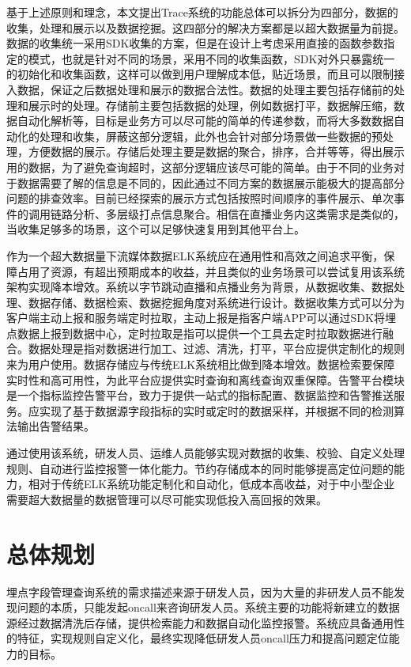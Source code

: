 基于上述原则和理念，本文提出Trace系统的功能总体可以拆分为四部分，数据的收集，处理和展示以及数据挖掘。这四部分的解决方案都是以超大数据量为前提。数据的收集统一采用SDK收集的方案，但是在设计上考虑采用直接的函数参数指定的模式，也就是针对不同的场景，采用不同的收集函数，SDK对外只暴露统一的初始化和收集函数，这样可以做到用户理解成本低，贴近场景，而且可以限制接入数据，保证之后数据处理和展示的数据合法性。数据的处理主要包括存储前的处理和展示时的处理。存储前主要包括数据的处理，例如数据打平，数据解压缩，数据自动化解析等，目标是业务方可以尽可能的简单的传递参数，而将大多数数据自动化的处理和收集，屏蔽这部分逻辑，此外也会针对部分场景做一些数据的预处理，方便数据的展示。存储后处理主要是数据的聚合，排序，合并等等，得出展示用的数据，为了避免查询超时，这部分逻辑应该尽可能的简单。由于不同的业务对于数据需要了解的信息是不同的，因此通过不同方案的数据展示能极大的提高部分问题的排查效率。目前已经探索的展示方式包括按照时间顺序的事件展示、单次事件的调用链路分析、多层级打点信息聚合。相信在直播业务内这类需求是类似的，当收集足够多的场景，这个可以足够快速复用到其他平台上。

作为一个超大数据量下流媒体数据ELK系统应在通用性和高效之间追求平衡，保障占用了资源，有超出预期成本的收益，并且类似的业务场景可以尝试复用该系统架构实现降本增效。系统以字节跳动直播和点播业务为背景，从数据收集、数据处理、数据存储、数据检索、数据挖掘角度对系统进行设计。数据收集方式可以分为客户端主动上报和服务端定时拉取，主动上报是指客户端APP可以通过SDK将埋点数据上报到数据中心，定时拉取是指可以提供一个工具去定时拉取数据进行融合。数据处理是指对数据进行加工、过滤、清洗，打平，平台应提供定制化的规则来为用户使用。数据存储应与传统ELK系统相比做到降本增效。数据检索要保障实时性和高可用性，为此平台应提供实时查询和离线查询双重保障。告警平台模块是一个指标监控告警平台，致力于提供一站式的指标配置、数据监控和告警推送服务。应实现了基于数据源字段指标的实时或定时的数据采样，并根据不同的检测算法输出告警结果。

通过使用该系统，研发人员、运维人员能够实现对数据的收集、校验、自定义处理规则、自动进行监控报警一体化能力。节约存储成本的同时能够提高定位问题的能力，相对于传统ELK系统功能定制化和自动化，低成本高收益，对于中小型企业需要超大数据量的数据管理可以尽可能实现低投入高回报的效果。

\section{总体规划}
埋点字段管理查询系统的需求描述来源于研发人员，因为大量的非研发人员不能发现问题的本质，只能发起oncall来咨询研发人员。系统主要的功能将新建立的数据源经过数据清洗后存储，提供检索能力和数据自动化监控报警。系统应具备通用性的特征，实现规则自定义化，最终实现降低研发人员oncall压力和提高问题定位能力的目标。
